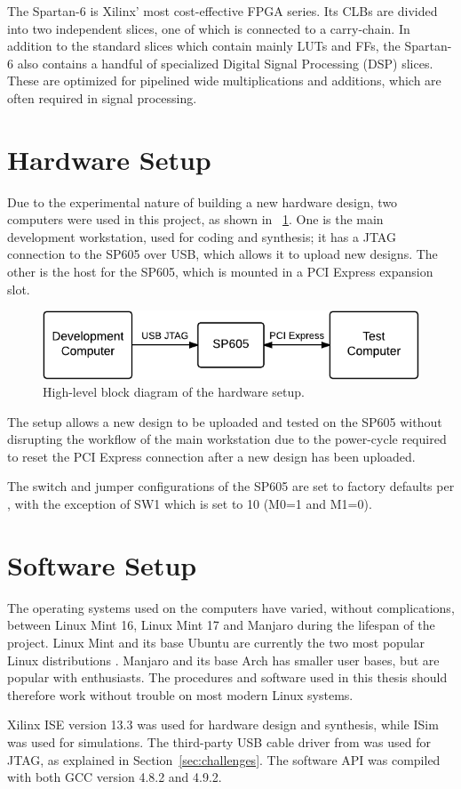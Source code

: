 The Spartan-6 is Xilinx' most cost-effective FPGA series.
Its CLBs are divided into two independent slices, one of which is connected to a carry-chain.
In addition to the standard slices which contain mainly LUTs and FFs, the Spartan-6 also contains a handful of specialized Digital Signal Processing (DSP) slices.
These are optimized for pipelined wide multiplications and additions, which are often required in signal processing.

\section{Hardware Setup}

Due to the experimental nature of building a new hardware design, two computers were used in this project, as shown in \figurename~\ref{fig:hardware-setup}.
One is the main development workstation, used for coding and synthesis; it has a JTAG connection to the SP605 over USB, which allows it to upload new designs.
The other is the host for the SP605, which is mounted in a PCI Express expansion slot.

\begin{figure}[!ht]
    \centering
    \includegraphics[width=32\block]{figures/hardware-setup}
    \caption[Hardware setup]{
        High-level block diagram of the hardware setup.
    }
    \label{fig:hardware-setup}
\end{figure}

The setup allows a new design to be uploaded and tested on the SP605 without disrupting the workflow of the main workstation due to the power-cycle required to reset the PCI Express connection after a new design has been uploaded.

The switch and jumper configurations of the SP605 are set to factory defaults per \cite{ug526}, with the exception of SW1 which is set to 10 (M0=1 and M1=0).

\section{Software Setup}

The operating systems used on the computers have varied, without complications, between Linux Mint 16, Linux Mint 17 and Manjaro during the lifespan of the project.
Linux Mint and its base Ubuntu are currently the two most popular Linux distributions \cite{distrowatch}.
Manjaro and its base Arch has smaller user bases, but are popular with enthusiasts.
The procedures and software used in this thesis should therefore work without trouble on most modern Linux systems.

Xilinx ISE version 13.3 was used for hardware design and synthesis, while ISim was used for simulations.
The third-party USB cable driver from \cite{usbdriver} was used for JTAG, as explained in Section~\ref{sec:challenges}.
The software API was compiled with both GCC version 4.8.2 and 4.9.2.

